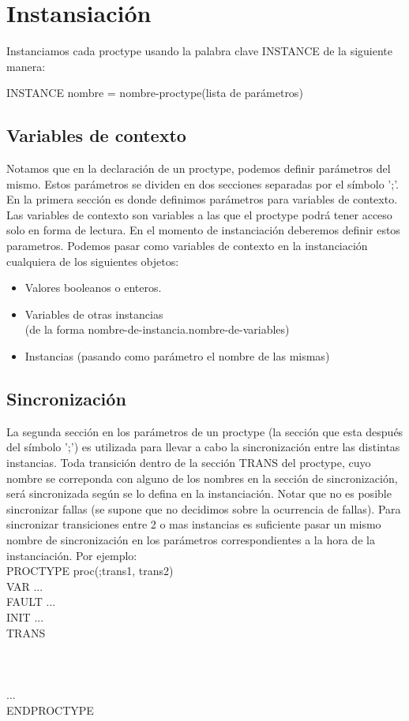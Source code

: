 \documentclass[titlepage, 12pt]{book}
\begin{document}
\section{Instansiaci\'on}

Instanciamos cada proctype usando la palabra clave INSTANCE de la siguiente manera:
\begin{center}INSTANCE nombre = nombre-proctype(lista de par\'ametros)\end{center}
\subsection{Variables de contexto}
Notamos que en la declaraci\'on de un proctype, podemos definir par\'ametros del mismo. Estos par\'ametros se dividen en dos secciones separadas por el s\'imbolo ';'. En la primera secci\'on es donde definimos par\'ametros para variables de contexto. Las variables de contexto son variables a las que el proctype podr\'a tener acceso solo en forma de lectura. En el momento de instanciaci\'on deberemos definir estos parametros. Podemos pasar como variables de contexto en la instanciaci\'on cualquiera de los siguientes objetos:
\begin{itemize}
\item Valores booleanos o enteros.
\item Variables de otras instancias\\ 
(de la forma nombre-de-instancia.nombre-de-variables)
\item Instancias (pasando como par\'ametro el nombre de las mismas)
\end{itemize}

\subsection{Sincronizaci\'on}
La segunda secci\'on en los par\'ametros de un proctype (la secci\'on que esta despu\'es del s\'imbolo ';') es utilizada para llevar a cabo la sincronizaci\'on entre las distintas instancias. Toda transici\'on dentro de la secci\'on TRANS del proctype, cuyo nombre se correponda con alguno de los nombres en la secci\'on de sincronizaci\'on, ser\'a sincronizada seg\'un se lo defina en la instanciaci\'on. Notar que no es posible sincronizar fallas (se supone que no decidimos sobre la ocurrencia de fallas).
Para sincronizar transiciones entre 2 o mas instancias es suficiente pasar un mismo nombre de sincronizaci\'on en los par\'ametros correspondientes a la hora de la instanciaci\'on.
Por ejemplo:\\
\newpage
\noindent PROCTYPE proc(;trans1, trans2)\\
\indent	VAR ...\\
\indent	FAULT ...\\
\indent	INIT ...\\
\indent	TRANS\\
\indent\indent		[trans1]\\
\indent\indent		[trans2]\\
\indent\indent		[trans2]\\
\indent\indent		...\\
ENDPROCTYPE\\
\end{document}
